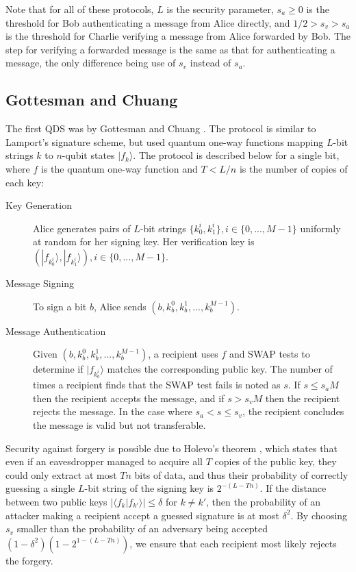 \documentclass[%
 reprint,
 amsmath,amssymb,
 aps,
 pra,
]{revtex4-1}
\begin{document}
Note that for all of these protocols, $L$ is the security parameter, $s_a \geq 0$ is the threshold for Bob authenticating a message from Alice directly, and $1/2 > s_v > s_a$ is the threshold for Charlie verifying a message from Alice forwarded by Bob. The step for verifying a forwarded message is the same as that for authenticating a message, the only difference being use of $s_v$ instead of $s_a$.

\subsection{Gottesman and Chuang}

The first QDS was by Gottesman and Chuang \citep{quant-ph/0105032}. The protocol is similar to Lamport's signature scheme, but used quantum one-way functions mapping $L$-bit strings $k$ to $n$-qubit states $|f_k\rangle$. The protocol is described below for a single bit, where $f$ is the quantum one-way function and $T < L/n$ is the number of copies of each key:

\begin{description}
\item[Key Generation]Alice generates pairs of $L$-bit strings $\{k^i_0, k^i_1\}, i \in \{0,...,M-1\}$ uniformly at random for her signing key. Her verification key is $(|f_{k^i_0}\rangle, |f_{k^i_1}\rangle), i \in \{0,...,M-1\}$.
\item[Message Signing]To sign a bit $b$, Alice sends $(b, k^0_b, k^1_b,...,k^{M-1}_b)$.
\item[Message Authentication]Given $(b, k^0_b, k^1_b,...,k^{M-1}_b)$, a recipient uses $f$ and SWAP tests \cite{PhysRevLett.87.167902} to determine if $|f_{k^i_b}\rangle$ matches the corresponding public key. The number of times a recipient finds that the SWAP test fails is noted as $s$. If $s \leq s_aM$ then the recipient accepts the message, and if $s > s_vM$ then the recipient rejects the message. In the case where $s_a < s \leq s_v$, the recipient concludes the message is valid but not transferable.
\end{description}

Security against forgery is possible due to Holevo's theorem \cite{Hol73}, which states that even if an eavesdropper managed to acquire all $T$ copies of the public key, they could only extract at most $Tn$ bits of data, and thus their probability of correctly guessing a single $L$-bit string of the signing key is $2^{-(L-Tn)}$. If the distance between two public keys $|\langle f_k|f_{k'}\rangle| \leq \delta$ for $k \neq k'$, then the probability of an attacker making a recipient accept a guessed signature is at most $\delta^2$. By choosing $s_v$ smaller than the probability of an adversary being accepted $(1 - \delta^2)(1 - 2^{1 - (L-Tn)})$, we ensure that each recipient most likely rejects the forgery.
\end{document}
